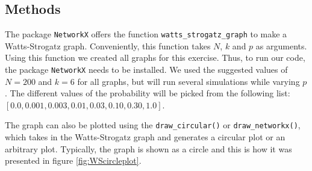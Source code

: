\subsection{Methods}
The package \verb+NetworkX+ offers the function \verb+watts_strogatz_graph+ to make a Watts-Strogatz graph. 
Conveniently, this function takes $N$, $k$ and $p$ as arguments. Using this function we created all graphs for this exercise.
Thus, to run our code, the package \verb+NetworkX+ needs to be installed.
We used the suggested values of $N=200$ and $k=6$ for all graphs, but will run several simulations while varying $p$. The different values of the probability will be picked from the following list: $[0.0, 0.001, 0.003, 0.01, 0.03, 0.10, 0.30, 1.0]$.

The graph can also be plotted using the \texttt{draw\_circular()} or \texttt{draw\_networkx()}, which takes in the Watts-Strogatz graph and generates a circular plot or an arbitrary plot. Typically, the graph is shown as a circle and this is how it was presented in figure \ref{fig:WScircleplot}.








